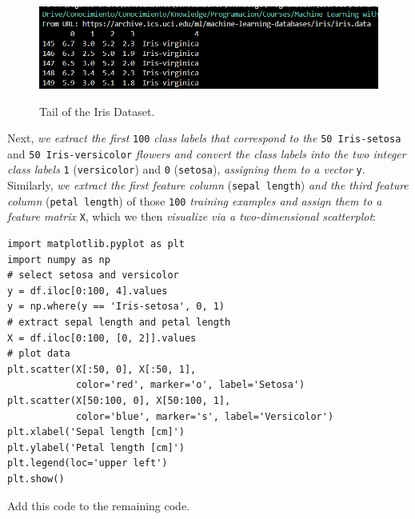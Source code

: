 \documentclass[../machine_learning_scikit.tex]{subfiles}
\begin{document}
    \begin{figure}[h]
        \begin{minipage}{\textwidth}
            \centering
            \includegraphics[scale=1]{images/tail_print_iris_dataset.png} \\
            \caption{Tail of the Iris Dataset.}
            \label{figure:tail_iris_dataset}
        \end{minipage}
    \end{figure}

    Next, \textit{we extract the first} \lstinline|100| \textit{class labels that correspond to the} \lstinline|50 Iris-setosa| and \lstinline|50 Iris-versicolor| \textit{flowers and convert the class labels into the two integer class labels} \lstinline|1| (\lstinline|versicolor|) and \lstinline|0| (\lstinline|setosa|), \textit{assigning them to a vector} \lstinline|y|. Similarly, \textit{we extract the first feature column} (\lstinline|sepal length|) \textit{and the third feature column} (\lstinline|petal length|) of those \lstinline|100| \textit{training examples and assign them to a feature matrix} \lstinline|X|, which we then \textit{visualize via a two-dimensional scatterplot}:

    \begin{lstlisting}[caption={Extraction and Visualization of Iris Dataset.},label=code:{extraction_and_visualization_iris_dataset}]
import matplotlib.pyplot as plt
import numpy as np
# select setosa and versicolor
y = df.iloc[0:100, 4].values
y = np.where(y == 'Iris-setosa', 0, 1)
# extract sepal length and petal length
X = df.iloc[0:100, [0, 2]].values
# plot data
plt.scatter(X[:50, 0], X[:50, 1],
            color='red', marker='o', label='Setosa')
plt.scatter(X[50:100, 0], X[50:100, 1],
            color='blue', marker='s', label='Versicolor')
plt.xlabel('Sepal length [cm]')
plt.ylabel('Petal length [cm]')
plt.legend(loc='upper left')
plt.show()
    \end{lstlisting}

    \begin{obs}
        Add this code to the remaining code.
    \end{obs}
\end{document}
